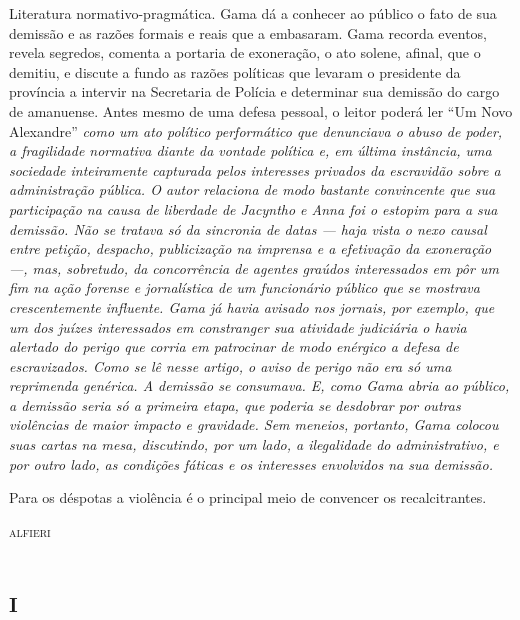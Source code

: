 \begin{didascalia}
Literatura normativo-pragmática. Gama dá a conhecer ao público o fato de
sua demissão e as razões formais e reais que a embasaram. Gama recorda
eventos, revela segredos, comenta a portaria de exoneração, o ato
solene, afinal, que o demitiu, e discute a fundo as razões políticas que
levaram o presidente da província a intervir na Secretaria de Polícia e
determinar sua demissão do cargo de amanuense. Antes mesmo de uma defesa
pessoal, o leitor poderá ler ``Um Novo Alexandre'' \emph{como um ato
político performático que denunciava o abuso de poder, a fragilidade
normativa diante da vontade política e, em última instância, uma
sociedade inteiramente capturada pelos interesses privados da escravidão
sobre a administração pública. O autor relaciona de modo bastante
convincente que sua participação na causa de liberdade de Jacyntho e
Anna foi o estopim para a sua demissão. Não se tratava só da sincronia
de datas --- haja vista o nexo causal entre petição, despacho,
publicização na imprensa e a efetivação da exoneração ---, mas,
sobretudo, da concorrência de agentes graúdos interessados em pôr um fim
na ação forense e jornalística de um funcionário público que se mostrava
crescentemente influente. Gama já havia avisado nos jornais, por
exemplo, que um dos juízes interessados em constranger sua atividade
judiciária o havia alertado do perigo que corria em patrocinar de modo
enérgico a defesa de escravizados. Como se lê nesse artigo, o aviso de
perigo não era só uma reprimenda genérica. A demissão se consumava. E,
como Gama abria ao público, a demissão seria só a primeira etapa, que
poderia se desdobrar por outras violências de maior impacto e gravidade.
Sem meneios, portanto, Gama colocou suas cartas na mesa, discutindo, por
um lado, a ilegalidade do administrativo, e por outro lado, as condições
fáticas e os interesses envolvidos na sua demissão.}
\end{didascalia}



\epigraph{Para os déspotas a violência é o principal meio de convencer os
recalcitrantes.}{\textsc{alfieri}\footnotemark}


\section{\textsc{i}}

